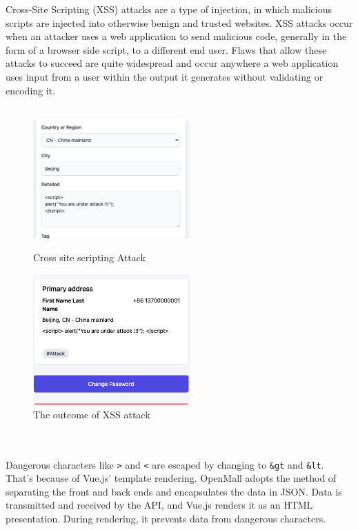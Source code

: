 \documentclass{article}
\begin{document}
Cross-Site Scripting (XSS) attacks are a type of injection, in which malicious scripts are injected into otherwise benign and trusted websites. XSS attacks occur when an attacker uses a web application to send malicious code, generally in the form of a browser side script, to a different end user. Flaws that allow these attacks to succeed are quite widespread and occur anywhere a web application uses input from a user within the output it generates without validating or encoding it. \cite{xss}
\\\\
\begin{figure}[htbp]
\centering
\begin{minipage}[t]{0.48\textwidth}
\centering
\includegraphics[width=6cm]{xss.png}
\caption{\label{fig:xss}Cross site scripting Attack}
\end{minipage}
\begin{minipage}[t]{0.48\textwidth}
\centering
\includegraphics[width=6cm]{xss-outcome.png}
\caption{\label{fig:xss-outcome}The outcome of XSS attack}
\end{minipage}
\end{figure}
\\\\
Dangerous characters like \verb|>| and \verb|<| are escaped by changing to \verb|&gt| and \verb|&lt|. That's because of Vue.js' template rendering. OpenMall adopts the method of separating the front and back ends and encapsulates the data in JSON. Data is transmitted and received by the API, and Vue.js renders it as an HTML presentation. During rendering, it prevents data from dangerous characters.
\end{document}
